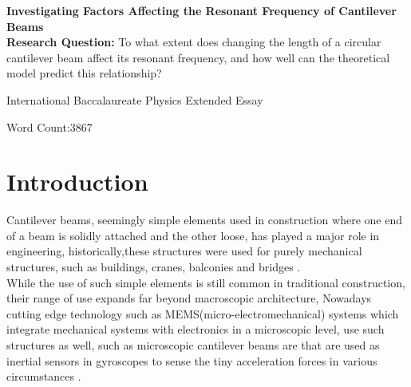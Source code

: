 \documentclass[a4paper,12pt]{article}
\newcommand{\ResearchQ}{To what extent does changing the length of a circular cantilever beam affect its resonant frequency, and how well can the theoretical model predict this relationship?}
\begin{document}
\begin{titlepage}
    \begin{center}
        \vspace*{1cm}

        \large
        \textbf{Investigating Factors Affecting the Resonant Frequency of Cantilever Beams}\\
        \normalsize
        \vspace{.5cm}
        \textbf{Research Question:}
        \ResearchQ

        \vspace{0.5cm}
        International Baccalaureate Physics Extended Essay

        \vfill

        \vspace{0.8cm}

        Word Count:3867


    \end{center}
\end{titlepage}
\tableofcontents
{}
\pagebreak



\section{Introduction}\label{Intro}%

Cantilever beams, seemingly simple elements used in construction where one end of a beam is solidly attached and the other loose, has played a major role in engineering, historically,these structures were used for purely mechanical structures, such as buildings, cranes, balconies and bridges \autocite{BuildingConstructionBook}.\\
While the use of such simple elements is still common in traditional construction, their range of use expands far beyond macroscopic architecture, Nowadays cutting edge technology such as MEMS(micro-electromechanical) systems which integrate mechanical systems with electronics in a microscopic level, use such structures as well, such as microscopic cantilever beams are that are used as inertial sensors in gyroscopes to sense the tiny acceleration forces in various circumstances \autocite{MemsBook}.%
\end{document}
